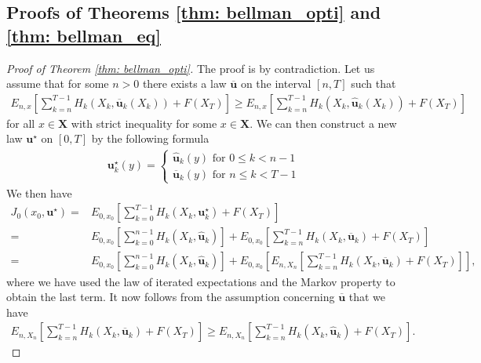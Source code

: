 \documentclass[\topdir/lecture\_notes.tex]{subfiles}
\begin{document}
\begin{optional}
\subsection[Proof of Principle of Optimality and Bellman Equation]{Proofs of Theorems \ref{thm: bellman_opti} and \ref{thm: bellman_eq}}

\begin{proof}[Proof of Theorem \ref{thm: bellman_opti}]
The proof is by contradiction. Let us assume that for some $n>0$ there exists a law $\overline{\mathbf{u}}$ on the interval $[n, T]$ such that
\begin{align*}
E_{n, x}\left[\sum_{k=n}^{T-1} H_{k}(X_{k}, \overline{\mathbf{u}}_{k}(X_{k}))+F(X_{T})\right] \geq E_{n, x}\left[\sum_{k=n}^{T-1} H_{k}(X_{k}, \hat{\mathbf{u}}_{k}(X_{k}))+F(X_{T})\right]
\end{align*}
for all $x \in \mathbf{X}$ with strict inequality for some $x \in \mathbf{X}$. We can then construct a new law $\mathbf{u}^{\star}$ on $[0, T]$ by the following formula
\begin{align*}
\mathbf{u}_{k}^{\star}(y)=\left\{\begin{array}{l}
\hat{\mathbf{u}}_{k}(y) \text { for } 0 \leq k<n-1 \\
\overline{\mathbf{u}}_{k}(y) \text { for } n \leq k<T-1
\end{array}\right.
\end{align*}
We then have
\begin{align*}
 J_{0}(x_{0}, \mathbf{u}^{\star})=&E_{0, x_{0}}\left[\sum_{k=0}^{T-1} H_{k}(X_{k}, \mathbf{u}_{k}^{\star})+F(X_{T})\right] \\
= & E_{0, x_{0}}\left[\sum_{k=0}^{n-1} H_{k}(X_{k}, \hat{\mathbf{u}}_{k})\right]+E_{0, x_{0}}\left[\sum_{k=n}^{T-1} H_{k}(X_{k}, \overline{\mathbf{u}}_{k})+F(X_{T})\right] \\
= & E_{0, x_{0}}\left[\sum_{k=0}^{n-1} H_{k}(X_{k}, \hat{\mathbf{u}}_{k})\right]+E_{0, x_{0}}\left[E_{n, X_{n}}\left[\sum_{k=n}^{T-1} H_{k}(X_{k}, \overline{\mathbf{u}}_{k})+F(X_{T})\right]\right],
\end{align*}
where we have used the law of iterated expectations and the Markov property to obtain the last term. It now follows from the assumption concerning $\overline{\mathbf{u}}$ that we have
\begin{align*}
E_{n, X_{n}}\left[\sum_{k=n}^{T-1} H_{k}(X_{k}, \overline{\mathbf{u}}_{k})+F(X_{T})\right] \geq E_{n, X_{n}}\left[\sum_{k=n}^{T-1} H_{k}(X_{k}, \hat{\mathbf{u}}_{k})+F(X_{T})\right].

\end{align*}
\end{proof}
\end{optional}
\end{document}
